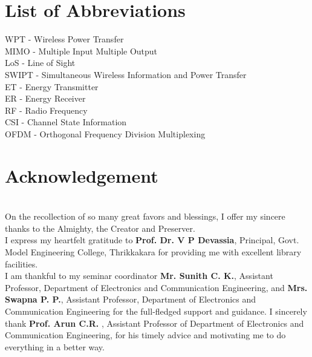 \documentclass[hidelinks, 12pt]{report}
\begin{document}
\section*{List of Abbreviations}
\begin{flushleft}
WPT -  Wireless Power Transfer\\ 
\vspace{0.5cm}
MIMO - Multiple Input Multiple Output\\
\vspace{0.5cm}
LoS - Line of Sight\\
\vspace{0.5cm}
SWIPT - Simultaneous Wireless Information and Power Transfer\\
\vspace{0.5cm}
ET - Energy Transmitter\\
\vspace{0.5cm}
ER - Energy Receiver\\
\vspace{0.5cm}
RF - Radio Frequency\\
\vspace{0.5cm}
CSI - Channel State Information\\
\vspace{0.5cm}
OFDM - Orthogonal Frequency Division Multiplexing\\
\end{flushleft}
\pagebreak

\section*{Acknowledgement}
\justify
\\On the recollection of so many great favors and blessings, I offer my sincere thanks to the Almighty, the Creator and Preserver.\\

I express my heartfelt gratitude to \textbf{Prof. Dr. V P Devassia}, Principal, Govt. Model Engineering College, Thrikkakara for providing me with excellent library facilities. \\
I am thankful to my seminar coordinator \textbf{Mr. Sunith C. K.}, Assistant Professor, Department of Electronics and Communication Engineering, and \textbf{Mrs. Swapna P. P.}, Assistant Professor, Department of Electronics and Communication Engineering for the full-fledged support and guidance. I sincerely thank \textbf{Prof. Arun C.R.} , Assistant Professor of Department of Electronics and Communication Engineering, for his timely advice and motivating me to do everything in a better way.\\
\end{document}
